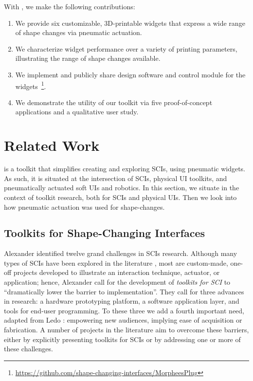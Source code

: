     With \mp, we make the following contributions:     
      \begin{enumerate}
        \item We provide six customizable, 3D-printable widgets that express
          a wide range of shape changes via pneumatic actuation.
        \item We characterize widget performance over a variety of printing
          parameters, illustrating the range of shape changes available.
        \item We implement and publicly share design software and control
          module for the
          widgets~\footnote{\url{https://github.com/shape-changing-interfaces/MorpheesPlug}}.
        \item We demonstrate the utility of our toolkit via five
          proof-of-concept applications and a qualitative user study.
      \end{enumerate}

  \section{Related Work}
    \mp is a toolkit that simplifies creating and exploring SCIs, using
    pneumatic widgets. As such, it is situated at the intersection of
    SCIs, physical UI toolkits, and pneumatically actuated soft UIs and
    robotics. In this section, we situate \mp in the context of toolkit
    research, both for SCIs and physical UIs. Then we look into how
    pneumatic actuation was used for shape-changes.
    
    \subsection{Toolkits for Shape-Changing Interfaces}
      Alexander \etal \cite{Alexander:2018} identified twelve grand
      challenges in SCIs research. Although many types of SCIs have been
      explored in the literature \cite{Sturdee:2018ce}, most are custom-made,
      one-off projects developed to illustrate an interaction technique,
      actuator, or application; hence, Alexander \etal
      \cite{Alexander:2018} call for the development of
      \textit{toolkits for SCI} to ``dramatically lower the barrier to
      implementation''. They call for three advances in research: a hardware
      prototyping platform, a software application layer, and tools for end-user
      programming. To these three we add a fourth important need, adapted from
      Ledo \etal \cite{Ledo:2018a}: empowering new audiences, implying ease of
      acquisition or fabrication. A number of projects in the literature aim to
      overcome these barriers, either by explicitly presenting toolkits for SCIs
      or by addressing one or more of these challenges.
      
